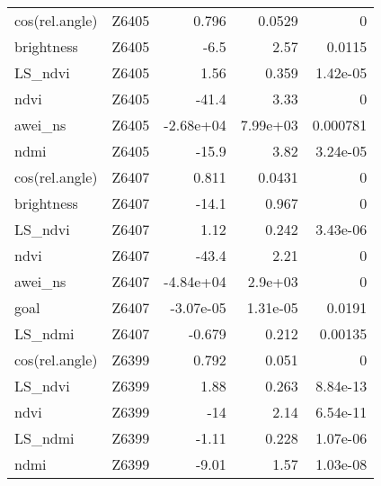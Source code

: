 \begin{table}[H]
\begin{tabular}{llrrr}
  cos(rel.angle) & Z6405 & 0.796 & 0.0529 &    0 \\ 
  brightness & Z6405 & -6.5 & 2.57 & 0.0115 \\ 
  LS\_ndvi & Z6405 & 1.56 & 0.359 & 1.42e-05 \\ 
  ndvi & Z6405 & -41.4 & 3.33 &    0 \\ 
  awei\_ns & Z6405 & -2.68e+04 & 7.99e+03 & 0.000781 \\ 
  ndmi & Z6405 & -15.9 & 3.82 & 3.24e-05 \\ 
  cos(rel.angle) & Z6407 & 0.811 & 0.0431 &    0 \\ 
  brightness & Z6407 & -14.1 & 0.967 &    0 \\ 
  LS\_ndvi & Z6407 & 1.12 & 0.242 & 3.43e-06 \\ 
  ndvi & Z6407 & -43.4 & 2.21 &    0 \\ 
  awei\_ns & Z6407 & -4.84e+04 & 2.9e+03 &    0 \\ 
  goal & Z6407 & -3.07e-05 & 1.31e-05 & 0.0191 \\ 
  LS\_ndmi & Z6407 & -0.679 & 0.212 & 0.00135 \\ 
  cos(rel.angle) & Z6399 & 0.792 & 0.051 &    0 \\ 
  LS\_ndvi & Z6399 & 1.88 & 0.263 & 8.84e-13 \\ 
  ndvi & Z6399 &  -14 & 2.14 & 6.54e-11 \\ 
  LS\_ndmi & Z6399 & -1.11 & 0.228 & 1.07e-06 \\ 
  ndmi & Z6399 & -9.01 & 1.57 & 1.03e-08 \\ 
   \hline
\end{tabular}
\end{table}
